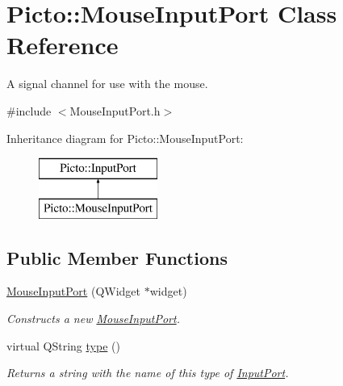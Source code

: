 \hypertarget{class_picto_1_1_mouse_input_port}{\section{Picto\-:\-:Mouse\-Input\-Port Class Reference}
\label{class_picto_1_1_mouse_input_port}
}


A signal channel for use with the mouse.  




{\ttfamily \#include $<$Mouse\-Input\-Port.\-h$>$}

Inheritance diagram for Picto\-:\-:Mouse\-Input\-Port\-:\begin{figure}[H]
\begin{center}
\leavevmode
\includegraphics[height=2.000000cm]{class_picto_1_1_mouse_input_port}
\end{center}
\end{figure}
\subsection*{Public Member Functions}
\begin{DoxyCompactItemize}
\item 
\hyperlink{class_picto_1_1_mouse_input_port_a598e2169686e062dbd04aa58b7488895}{Mouse\-Input\-Port} (Q\-Widget $\ast$widget)
\begin{DoxyCompactList}\small\item\em Constructs a new \hyperlink{class_picto_1_1_mouse_input_port}{Mouse\-Input\-Port}. \end{DoxyCompactList}\item 
\hypertarget{class_picto_1_1_mouse_input_port_a15d88f319a80befe7c2d0d096b3a71ea}{virtual Q\-String \hyperlink{class_picto_1_1_mouse_input_port_a15d88f319a80befe7c2d0d096b3a71ea}{type} ()}\label{class_picto_1_1_mouse_input_port_a15d88f319a80befe7c2d0d096b3a71ea}

\begin{DoxyCompactList}\small\item\em Returns a string with the name of this type of \hyperlink{class_picto_1_1_input_port}{Input\-Port}. \end{DoxyCompactList}\end{DoxyCompactItemize}
